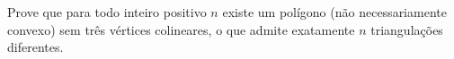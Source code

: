 Prove que para todo inteiro positivo $ n $ existe um polígono (não necessariamente convexo) sem três vértices colineares, o que admite exatamente $ n $ triangulações diferentes.